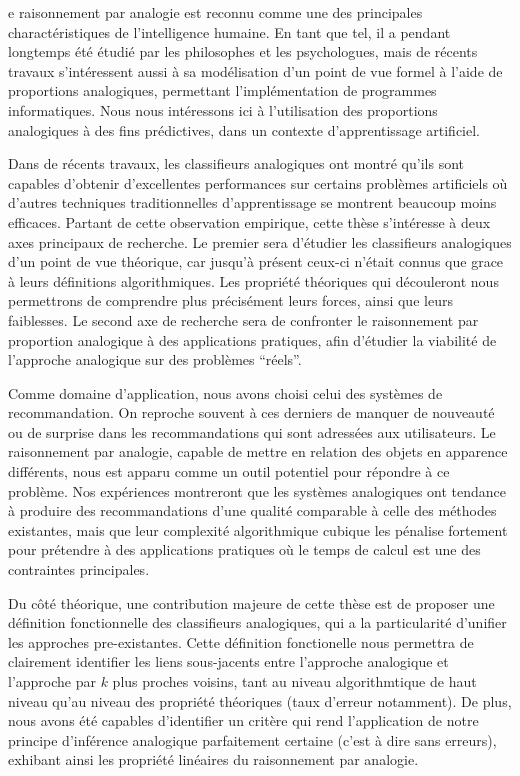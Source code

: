 e raisonnement par analogie est reconnu comme une des principales
charactéristiques de l'intelligence humaine. En tant que tel, il a pendant
longtemps été étudié par les philosophes et les psychologues, mais de récents
travaux s'intéressent aussi à sa modélisation d'un point de vue formel à l'aide
de proportions analogiques, permettant l'implémentation de programmes
informatiques. Nous nous intéressons ici à l'utilisation des proportions
analogiques à des fins prédictives, dans un contexte d'apprentissage
artificiel.

Dans de récents travaux, les classifieurs analogiques ont montré qu'ils sont
capables d'obtenir d'excellentes performances sur certains problèmes
artificiels où d'autres techniques traditionnelles d'apprentissage se montrent
beaucoup moins efficaces. Partant de cette observation empirique, cette thèse
s'intéresse à deux axes principaux de recherche. Le premier sera d'étudier les
classifieurs analogiques d'un point de vue théorique, car jusqu'à présent
ceux-ci n'était connus que grace à leurs définitions algorithmiques. Les
propriété théoriques qui découleront nous permettrons de comprendre plus
précisément leurs forces, ainsi que leurs faiblesses. Le second axe de
recherche sera de confronter le raisonnement par proportion analogique à des
applications pratiques, afin d'étudier la viabilité de l'approche analogique
sur des problèmes ``réels''.

Comme domaine d'application, nous avons choisi celui des systèmes de
recommandation. On reproche souvent à ces derniers de manquer de nouveauté ou
de surprise dans les recommandations qui sont adressées aux utilisateurs. Le
raisonnement par analogie, capable de mettre en relation des objets en
apparence différents, nous est apparu comme un outil potentiel pour répondre à
ce problème. Nos expériences montreront que les systèmes analogiques ont
tendance à produire des recommandations d'une qualité comparable à celle des
méthodes existantes, mais que leur complexité algorithmique cubique les
pénalise fortement pour prétendre à des applications pratiques où le temps de
calcul est une des contraintes principales.

Du côté théorique, une contribution majeure de cette thèse est de proposer une
définition fonctionnelle des classifieurs analogiques, qui a la particularité
d'unifier les approches pre-existantes. Cette définition fonctionelle nous
permettra de clairement identifier les liens sous-jacents entre l'approche
analogique et l'approche par $k$ plus proches voisins, tant au niveau
algorithmtique de haut niveau qu'au niveau des propriété théoriques (taux
d'erreur notamment). De plus, nous avons été capables d'identifier un critère
qui rend l'application de notre principe d'inférence analogique parfaitement
certaine (c'est à dire sans erreurs),  exhibant ainsi les propriété linéaires
du raisonnement par analogie.

